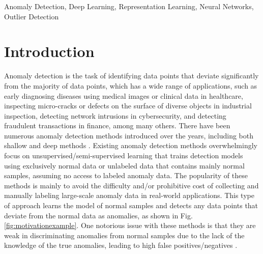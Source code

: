 \documentclass[10pt,journal,compsoc]{IEEEtran}
\begin{document}
{\begin{abstract}
\end{abstract}
\begin{IEEEkeywords}
Anomaly Detection, Deep Learning, Representation Learning, 
Neural Networks, Outlier Detection
\end{IEEEkeywords}
}





\maketitle



\section{Introduction}

Anomaly detection is the task of identifying data points that deviate significantly from the majority of data points,
which has a wide range of applications, 
such as  early diagnosing 
diseases using medical images or clinical data in healthcare, inspecting micro-cracks or defects on the surface of diverse objects in industrial inspection, detecting network intrusions in cybersecurity, and detecting fraudulent transactions in finance, among many others. There have been numerous anomaly detection methods introduced over the years, including both shallow and deep methods \cite{chandola2009anomaly,aggarwal2017outlieranalysis,pang2021deep}. Existing anomaly detection methods overwhelmingly focus on unsupervised/semi-supervised learning that trains detection models using exclusively normal data or unlabeled data that contains mainly normal samples, assuming no access to labeled anomaly data. The popularity of these methods is mainly to avoid the difficulty and/or prohibitive cost of collecting and manually labeling large-scale anomaly data in real-world applications. This type of approach learns the model of normal samples and detects any data points that deviate from the normal data as anomalies, as shown in Fig. \ref{fig:motivationexample}. One notorious issue with these methods is that they are weak in discriminating anomalies from normal samples due to the lack of the knowledge of the true anomalies, leading to high false positives/negatives \cite{gornitz2013toward,pang2018repen,siddiqui2018kdd,ruff2020deep,pang2021deep}. 
\end{document}
